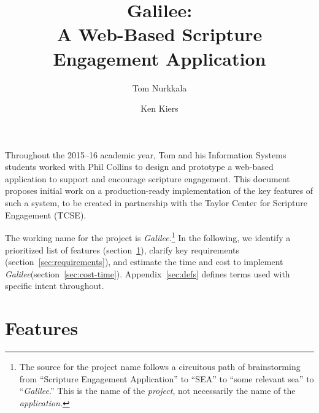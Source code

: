 \documentclass{article}
\title{Galilee:\\A Web-Based Scripture Engagement Application}
\author{Tom Nurkkala \and Ken Kiers}
\newcommand{\gal}{\emph{Galilee}}
\begin{document}
\maketitle

Throughout the 2015--16 academic year,
Tom and his Information Systems students
worked with Phil Collins
to design and prototype
a web-based application
to support and encourage scripture engagement.
This document proposes initial work
on a production-ready implementation of
the key features of such a system,
to be created in partnership
with the Taylor Center for Scripture Engagement (TCSE).

The working name for the project
is \gal.\footnote{The source for the project name
  follows a circuitous path of brainstorming
  from ``Scripture Engagement Application''
  to ``SEA''
  to ``some relevant sea''
  to ``\gal.''
  This is the name of the \emph{project},
  not necessarily the name of the \emph{application}.}
In the following,
we identify a prioritized list of features (section~\ref{sec:features}),
clarify key requirements (section~\ref{sec:requirements}),
and estimate the time and cost to implement \gal (section~\ref{sec:cost-time}).
Appendix~\ref{sec:defs} defines terms used with specific intent throughout.

\section{Features}
\label{sec:features}
\end{document}
